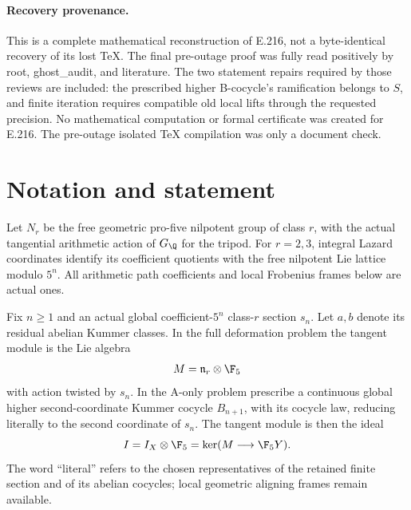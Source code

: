 \paragraph{Recovery provenance.}
This is a complete mathematical reconstruction of E.216, not a byte-identical recovery of its lost TeX. The final pre-outage proof was fully read positively by root, ghost\_audit, and literature. The two statement repairs required by those reviews are included: the prescribed higher B-cocycle's ramification belongs to $S$, and finite iteration requires compatible old local lifts through the requested precision. No mathematical computation or formal certificate was created for E.216. The pre-outage isolated TeX compilation was only a document check.

\section*{Notation and statement}
Let $N_r$ be the free geometric pro-five nilpotent group of class $r$, with the actual tangential arithmetic action of $G_\Q$ for the tripod. For $r=2,3$, integral Lazard coordinates identify its coefficient quotients with the free nilpotent Lie lattice modulo $5^n$. All arithmetic path coefficients and local Frobenius frames below are actual ones.

Fix $n\ge1$ and an actual global coefficient-$5^n$ class-$r$ section $s_n$. Let $a,b$ denote its residual abelian Kummer classes. In the full deformation problem the tangent module is the Lie algebra
\[
 M=\mathfrak n_r\otimes\F_5
\]
with action twisted by $s_n$. In the A-only problem prescribe a continuous global higher second-coordinate Kummer cocycle $B_{n+1}$, with its cocycle law, reducing literally to the second coordinate of $s_n$. The tangent module is then the ideal
\[
 I=I_X\otimes\F_5=\ker(M\longrightarrow\F_5Y).
\]
The word ``literal'' refers to the chosen representatives of the retained finite section and of its abelian cocycles; local geometric aligning frames remain available.

